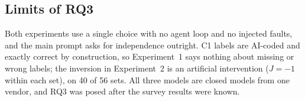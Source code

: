 \subsection{Limits of RQ3}

Both experiments use a single choice with no agent loop and no injected faults, and the main prompt asks for independence outright. C1 labels are AI-coded and exactly correct by construction, so Experiment~1 says nothing about missing or wrong labels; the inversion in Experiment~2 is an artificial intervention ($J=-1$ within each set), on 40 of 56 sets. All three models are closed models from one vendor, and RQ3 was posed after the survey results were known.
